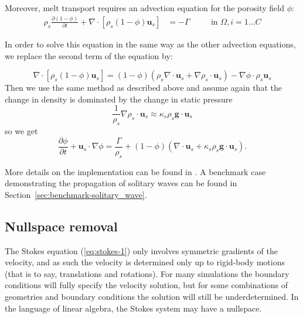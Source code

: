 \documentclass{article}
\begin{document}
Moreover, melt transport requires an advection equation for the porosity field $\phi$:
\begin{align}
  \label{eq:porosity}
  \rho_s \frac{\partial (1 - \phi)}{\partial t} + \nabla \cdot \left[ \rho_s (1 - \phi) \mathbf{u}_s \right]
  &=
  - \Gamma
  & \quad
  & \textrm{in $\Omega$},
  i=1\ldots C
\end{align}

In order to solve this equation in the same way as the other advection equations, we replace the second term of the equation by: 

\begin{equation*}
\nabla \cdot \left[ \rho_s (1 - \phi) \mathbf{u}_s \right]
= \left( 1-\phi \right) \left( \rho_s \nabla \cdot \mathbf{u}_s 
+ \nabla \rho_s \cdot \mathbf{u}_s \right)
- \nabla \phi \cdot \rho_s \mathbf{u}_s 
\end{equation*}
Then we use the same method as described above and assume again that the change in density is dominated by the change in static pressure
\begin{equation*}
\frac{1}{\rho_s} \nabla \rho_s \cdot \mathbf{u}_s 
\approx \kappa_s \rho_s \textbf{g} \cdot \mathbf{u}_s 
\end{equation*}
so we get
\begin{equation*}
\frac{\partial \phi}{\partial t} + \mathbf{u}_s \cdot \nabla \phi
= \frac{\Gamma}{\rho_s}
+ (1 - \phi) (\nabla \cdot \mathbf{u}_s + \kappa_s \rho_s \textbf{g} \cdot \mathbf{u}_s ).
\end{equation*}

More details on the implementation can be found in \cite{dannberg_melt}. A benchmark case demonstrating the propagation of solitary waves can be found in Section~\ref{sec:benchmark-solitary_wave}.

\subsection{Nullspace removal}

The Stokes equation (\ref{eq:stokes-1}) only involves symmetric gradients of the velocity, and as such 
the velocity is determined only up to rigid-body motions (that is to say, translations and rotations).
For many simulations the boundary conditions will fully specify the velocity solution, but for some 
combinations of geometries and boundary conditions the solution will still be underdetermined.
In the language of linear algebra, the Stokes system may have a nullspace.
\end{document}
